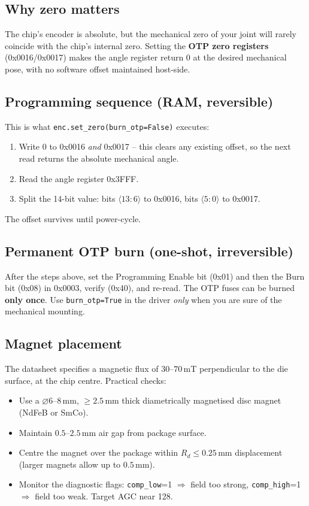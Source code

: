 \documentclass[11pt,a4paper]{article}
\begin{document}
\subsection{Why zero matters}
The chip's encoder is absolute, but the mechanical zero of your joint
will rarely coincide with the chip's internal zero.  Setting the
\textbf{OTP zero registers} (0x0016/0x0017) makes the angle register
return 0 at the desired mechanical pose, with no software offset
maintained host-side.

\subsection{Programming sequence (RAM, reversible)}
This is what \texttt{enc.set\_zero(burn\_otp=False)} executes:
\begin{enumerate}
  \item Write 0 to 0x0016 \emph{and} 0x0017 -- this clears any existing
        offset, so the next read returns the absolute mechanical angle.
  \item Read the angle register 0x3FFF.
  \item Split the 14-bit value: bits $\langle 13\!:\!6\rangle$ to
        0x0016, bits $\langle 5\!:\!0\rangle$ to 0x0017.
\end{enumerate}
The offset survives until power-cycle.

\subsection{Permanent OTP burn (one-shot, irreversible)}
After the steps above, set the Programming Enable bit (0x01) and then
the Burn bit (0x08) in 0x0003, verify (0x40), and re-read.  The OTP
fuses can be burned \textbf{only once}.  Use \texttt{burn\_otp=True} in
the driver \emph{only} when you are sure of the mechanical mounting.

\subsection{Magnet placement}
The datasheet specifies a magnetic flux of $30$--$70\,$mT perpendicular
to the die surface, at the chip centre.  Practical checks:
\begin{itemize}
  \item Use a $\diameter 6$--$8\,$mm, $\geq 2.5\,$mm thick diametrically
        magnetised disc magnet (NdFeB or SmCo).
  \item Maintain $0.5$--$2.5\,$mm air gap from package surface.
  \item Centre the magnet over the package within
        $R_d \leq 0.25\,$mm displacement (larger magnets allow up to
        $0.5\,$mm).
  \item Monitor the diagnostic flags:
        \texttt{comp\_low}=1 $\Rightarrow$ field too strong,
        \texttt{comp\_high}=1 $\Rightarrow$ field too weak.
        Target AGC near 128.
\end{itemize}
\end{document}
